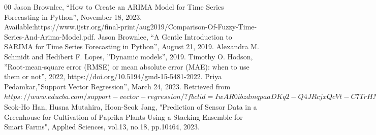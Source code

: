 \documentclass{ieeeojies}
\begin{document}
\begin{thebibliography}{00}
 Jason Brownlee, ``How to Create an ARIMA Model for Time Series Forecasting in Python'', November 18, 2023. Available:https://www.ijstr.org/final-print/aug2019/Comparison-Of-Fuzzy-Time-Series-And-Arima-Model.pdf. 
 Jason Brownlee, ``A Gentle Introduction to SARIMA for Time Series Forecasting in Python'', August 21, 2019. 
 Alexandra M. Schmidt and Hedibert F. Lopes, ''Dynamic models'', 2019. 
 Timothy O. Hodson, ''Root-mean-square error (RMSE) or mean absolute error (MAE): when to use them or not'', 2022, https://doi.org/10.5194/gmd-15-5481-2022.
 Priya Pedamkar,''Support Vector Regression'', March 24, 2023. Retrieved from \(https://www.educba.com/support-vector-regression/?fbclid=IwAR0ibzdmqpaaDKq2-Q4JRcjxQcVt-C7TrHNEc90q_tCSrn8rds9x2AG8Y78\)
 Seok-Ho Han, Husna Mutahira, Hoon-Seok Jang, "Prediction of Sensor Data in a Greenhouse for Cultivation of Paprika Plants Using a Stacking Ensemble for Smart Farms", Applied Sciences, vol.13, no.18, pp.10464, 2023.

\end{thebibliography}


\EOD
\end{document}
